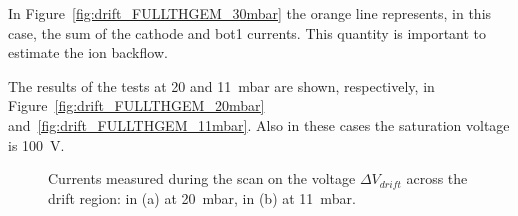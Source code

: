 \documentclass[a4paper, 11 pt]{article}
\newcommand{\Vdrift}{$ \Delta V_{drift}$}
\begin{document}
In Figure~\ref{fig:drift_FULLTHGEM_30mbar} the orange line represents, in this case, the sum of the cathode and bot1 currents.
This quantity is important to estimate the ion backflow. 



The results of the tests at 20 and 11~mbar are shown, respectively, in Figure~\ref{fig:drift_FULLTHGEM_20mbar} and~\ref{fig:drift_FULLTHGEM_11mbar}.
Also in these cases the saturation voltage is 100~V.



\begin{figure}[!htb]
	\centering
	\caption{Currents measured during the scan on the voltage \Vdrift{} across the drift region: in (a) at 20~mbar, in (b) at 11~mbar.}
	\label{fig:drift_FULLTHGEM_other_pressure}
\end{figure}
\end{document}
